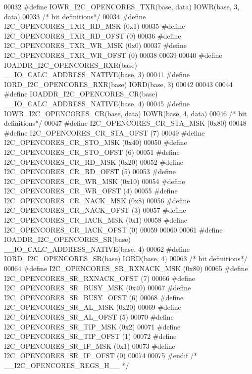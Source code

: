 \begin{DoxyCode}
00032 \textcolor{preprocessor}{#define IOWR\_I2C\_OPENCORES\_TXR(base, data)   IOWR(base, 3, data)}
00033 \textcolor{comment}{/* bit definitions*/}
00034 \textcolor{preprocessor}{#define I2C\_OPENCORES\_TXR\_RD\_MSK             (0x1)}
00035 \textcolor{preprocessor}{#define I2C\_OPENCORES\_TXR\_RD\_OFST            (0)}
00036 \textcolor{preprocessor}{#define I2C\_OPENCORES\_TXR\_WR\_MSK             (0x0)}
00037 \textcolor{preprocessor}{#define I2C\_OPENCORES\_TXR\_WR\_OFST            (0)}
00038 
00039 
00040 \textcolor{preprocessor}{#define IOADDR\_I2C\_OPENCORES\_RXR(base)       \_\_IO\_CALC\_ADDRESS\_NATIVE(base, 3)}
00041 \textcolor{preprocessor}{#define IORD\_I2C\_OPENCORES\_RXR(base)         IORD(base, 3)}
00042 
00043 
00044 \textcolor{preprocessor}{#define IOADDR\_I2C\_OPENCORES\_CR(base)       \_\_IO\_CALC\_ADDRESS\_NATIVE(base, 4)}
00045 \textcolor{preprocessor}{#define IOWR\_I2C\_OPENCORES\_CR(base, data)   IOWR(base, 4, data)}
00046 \textcolor{comment}{/* bit definitions*/}
00047 \textcolor{preprocessor}{#define I2C\_OPENCORES\_CR\_STA\_MSK             (0x80)}
00048 \textcolor{preprocessor}{#define I2C\_OPENCORES\_CR\_STA\_OFST            (7)}
00049 \textcolor{preprocessor}{#define I2C\_OPENCORES\_CR\_STO\_MSK             (0x40)}
00050 \textcolor{preprocessor}{#define I2C\_OPENCORES\_CR\_STO\_OFST            (6)}
00051 \textcolor{preprocessor}{#define I2C\_OPENCORES\_CR\_RD\_MSK              (0x20)}
00052 \textcolor{preprocessor}{#define I2C\_OPENCORES\_CR\_RD\_OFST             (5)}
00053 \textcolor{preprocessor}{#define I2C\_OPENCORES\_CR\_WR\_MSK              (0x10)}
00054 \textcolor{preprocessor}{#define I2C\_OPENCORES\_CR\_WR\_OFST             (4)}
00055 \textcolor{preprocessor}{#define I2C\_OPENCORES\_CR\_NACK\_MSK             (0x8)}
00056 \textcolor{preprocessor}{#define I2C\_OPENCORES\_CR\_NACK\_OFST            (3)}
00057 \textcolor{preprocessor}{#define I2C\_OPENCORES\_CR\_IACK\_MSK            (0x1)}
00058 \textcolor{preprocessor}{#define I2C\_OPENCORES\_CR\_IACK\_OFST           (0)}
00059 
00060 
00061 \textcolor{preprocessor}{#define IOADDR\_I2C\_OPENCORES\_SR(base)       \_\_IO\_CALC\_ADDRESS\_NATIVE(base, 4)}
00062 \textcolor{preprocessor}{#define IORD\_I2C\_OPENCORES\_SR(base)         IORD(base, 4)}
00063 \textcolor{comment}{/* bit definitions*/}
00064 \textcolor{preprocessor}{#define I2C\_OPENCORES\_SR\_RXNACK\_MSK           (0x80)}
00065 \textcolor{preprocessor}{#define I2C\_OPENCORES\_SR\_RXNACK\_OFST          (7)}
00066 \textcolor{preprocessor}{#define I2C\_OPENCORES\_SR\_BUSY\_MSK            (0x40)}
00067 \textcolor{preprocessor}{#define I2C\_OPENCORES\_SR\_BUSY\_OFST           (6)}
00068 \textcolor{preprocessor}{#define I2C\_OPENCORES\_SR\_AL\_MSK              (0x20)}
00069 \textcolor{preprocessor}{#define I2C\_OPENCORES\_SR\_AL\_OFST             (5)}
00070 \textcolor{preprocessor}{#define I2C\_OPENCORES\_SR\_TIP\_MSK             (0x2)}
00071 \textcolor{preprocessor}{#define I2C\_OPENCORES\_SR\_TIP\_OFST            (1)}
00072 \textcolor{preprocessor}{#define I2C\_OPENCORES\_SR\_IF\_MSK              (0x1)}
00073 \textcolor{preprocessor}{#define I2C\_OPENCORES\_SR\_IF\_OFST             (0)}
00074 
00075 \textcolor{preprocessor}{#endif }\textcolor{comment}{/* \_\_I2C\_OPENCORES\_REGS\_H\_\_ */}\textcolor{preprocessor}{}
\end{DoxyCode}

